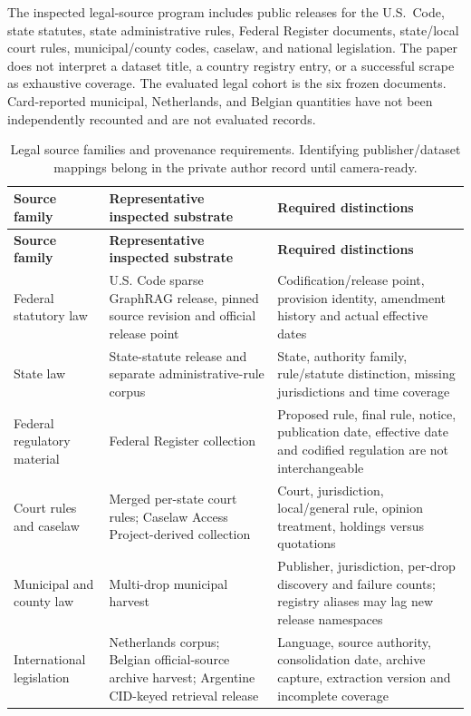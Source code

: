 \documentclass{article}
\begin{document}
The inspected legal-source program includes public releases for the U.S.\ Code, state statutes, state administrative rules, Federal Register documents, state/local court rules, municipal/county codes, caselaw, and national legislation. The paper does not interpret a dataset title, a country registry entry, or a successful scrape as exhaustive coverage. The evaluated legal cohort is the six frozen documents. Card-reported municipal, Netherlands, and Belgian quantities have not been independently recounted and are not evaluated records.
\begingroup
\renewcommand{\thetable}{A1}
\begin{longtable}{@{}>{\raggedright\arraybackslash}p{.24\linewidth} >{\raggedright\arraybackslash}p{.32\linewidth} >{\raggedright\arraybackslash}p{.38\linewidth}@{}}
\caption{Legal source families and provenance requirements. Identifying publisher/dataset mappings belong in the private author record until camera-ready.}\label{tab:A1}\\
\toprule
\textbf{Source family} & \textbf{Representative inspected substrate} & \textbf{Required distinctions} \\
\midrule
\endfirsthead
\textbf{Source family} & \textbf{Representative inspected substrate} & \textbf{Required distinctions} \\
\midrule
\endhead
\bottomrule
\endlastfoot
Federal statutory law & U.S. Code sparse GraphRAG release, pinned source revision and official release point & Codification/release point, provision identity, amendment history and actual effective dates \\[3pt]
State law & State-statute release and separate administrative-rule corpus & State, authority family, rule/statute distinction, missing jurisdictions and time coverage \\[3pt]
Federal regulatory material & Federal Register collection & Proposed rule, final rule, notice, publication date, effective date and codified regulation are not interchangeable \\[3pt]
Court rules and caselaw & Merged per-state court rules; Caselaw Access Project-derived collection & Court, jurisdiction, local/general rule, opinion treatment, holdings versus quotations \\[3pt]
Municipal and county law & Multi-drop municipal harvest & Publisher, jurisdiction, per-drop discovery and failure counts; registry aliases may lag new release namespaces \\[3pt]
International legislation & Netherlands corpus; Belgian official-source archive harvest; Argentine CID-keyed retrieval release & Language, source authority, consolidation date, archive capture, extraction version and incomplete coverage \\[3pt]
\end{longtable}
\endgroup
\end{document}
